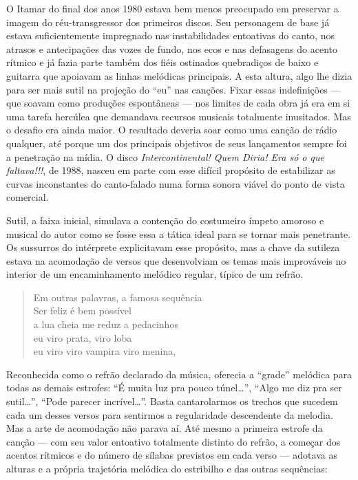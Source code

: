 O Itamar do final dos anos 1980 estava bem menos preocupado em preservar
a imagem do réu-transgressor dos primeiros discos. Seu personagem de
base já estava suficientemente impregnado nas instabilidades entoativas
do canto, nos atrasos e antecipações das vozes de fundo, nos ecos e nas
defasagens do acento rítmico e já fazia parte também dos fiéis ostinados
quebradiços de baixo e guitarra que apoiavam as linhas melódicas
principais. A esta altura, algo lhe dizia para ser mais sutil na
projeção do ``eu'' nas canções. Fixar essas indefinições --- que soavam
como produções espontâneas --- nos limites de cada obra já era em si uma
tarefa hercúlea que demandava recursos musicais totalmente inusitados.
Mas o desafio era ainda maior. O resultado deveria soar como uma canção
de rádio qualquer, até porque um dos principais objetivos de seus
lançamentos sempre foi a penetração na mídia. O disco \textit{Intercontinental!
Quem Diria! Era só o que faltava!!!}, de 1988, nasceu em parte com esse
difícil propósito de estabilizar as curvas inconstantes do canto-falado
numa forma sonora viável do ponto de vista comercial.

Sutil, a faixa inicial, simulava a contenção do costumeiro ímpeto
amoroso e musical do autor como se fosse essa a tática ideal para se
tornar mais penetrante. Os sussurros do intérprete explicitavam esse
propósito, mas a chave da sutileza estava na acomodação de versos que
desenvolviam os temas mais improváveis no interior de um encaminhamento
melódico regular, típico de um refrão.

\begin{verse}
Em outras palavras, a famosa sequência\\
Ser feliz é bem possível\\
a lua cheia me reduz a pedacinhos\\
eu viro prata, viro loba\\
eu viro viro vampira viro menina,
\end{verse}

Reconhecida como o refrão declarado da música, oferecia a ``grade''
melódica para todas as demais estrofes: ``É muita luz pra pouco
túnel\ldots'', ``Algo me diz pra ser sutil\ldots'', ``Pode parecer
incrível\ldots''. Basta cantarolarmos os trechos que sucedem cada um desses
versos para sentirmos a regularidade descendente da melodia. Mas a arte
de acomodação não parava aí. Até mesmo a primeira estrofe da canção ---
com seu valor entoativo totalmente distinto do refrão, a começar dos
acentos rítmicos e do número de sílabas previstos em cada verso ---
adotava as alturas e a própria trajetória melódica do estribilho e das
outras sequências:

